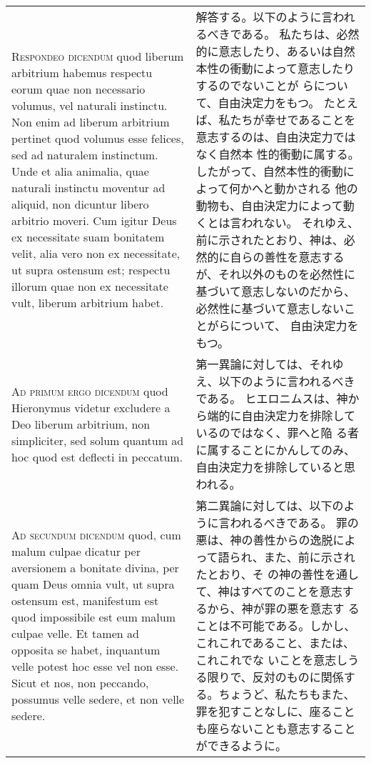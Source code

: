 \documentclass[10pt]{jsarticle} %
\begin{document}
\begin{longtable}{p{21em}p{21em}}
{\scshape Respondeo dicendum} quod liberum arbitrium
habemus respectu eorum quae non necessario volumus, vel naturali
instinctu. Non enim ad liberum arbitrium pertinet quod volumus esse
felices, sed ad naturalem instinctum. Unde et alia animalia, quae
naturali instinctu moventur ad aliquid, non dicuntur libero arbitrio
moveri. Cum igitur Deus ex necessitate suam bonitatem velit, alia vero
non ex necessitate, ut supra ostensum est; respectu illorum quae non ex
necessitate vult, liberum arbitrium habet.


&


解答する。以下のように言われるべきである。
私たちは、必然的に意志したり、あるいは自然本性の衝動によって意志したりするのでないことが
 らについて、自由決定力をもつ。
たとえば、私たちが幸せであることを意志するのは、自由決定力ではなく自然本
 性的衝動に属する。したがって、自然本性的衝動によって何かへと動かされる
 他の動物も、自由決定力によって動くとは言われない。
それゆえ、前に示されたとおり、神は、必然的に自らの善性を意志するが、それ以外のものを必然性に
 基づいて意志しないのだから、必然性に基づいて意志しないことがらについて、
 自由決定力をもつ。


\\


{\scshape Ad primum ergo dicendum} quod Hieronymus
videtur excludere a Deo liberum arbitrium, non simpliciter, sed solum
quantum ad hoc quod est deflecti in peccatum.


&


第一異論に対しては、それゆえ、以下のように言われるべきである。
ヒエロニムスは、神から端的に自由決定力を排除しているのではなく、罪へと陥
 る者に属することにかんしてのみ、自由決定力を排除していると思われる。

\\


{\scshape Ad secundum dicendum} quod, cum malum culpae
dicatur per aversionem a bonitate divina, per quam Deus omnia vult, ut
supra ostensum est, manifestum est quod impossibile est eum malum culpae
velle. Et tamen ad opposita se habet, inquantum velle potest hoc esse
vel non esse. Sicut et nos, non peccando, possumus velle sedere, et non
velle sedere.


&


第二異論に対しては、以下のように言われるべきである。
罪の悪は、神の善性からの逸脱によって語られ、また、前に示されたとおり、そ
 の神の善性を通して、神はすべてのことを意志するから、神が罪の悪を意志す
 ることは不可能である。しかし、これこれであること、または、これこれでな
 いことを意志しうる限りで、反対のものに関係する。ちょうど、私たちもまた、
 罪を犯すことなしに、座ることも座らないことも意志することができるように。


\end{longtable}
\newpage
\end{document}
